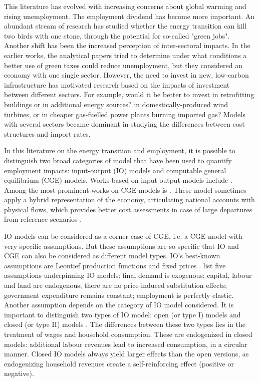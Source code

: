 This literature has evolved with increasing concerns about global warming and rising unemployment. The employment dividend has become more important. An abundant stream of research has studied whether the energy transition can kill two birds with one stone, through the potential for so-called "green jobs".
Another shift has been the increased perception of inter-sectoral impacts.
In the earlier works, the analytical papers \citep{Bovenberg1994, Bovenberg1996} tried to determine under what conditions a better use of green taxes could reduce unemployment, but they considered an economy with one single sector.
However, the need to invest in new, low-carbon infrastructure has motivated research based on the impacts of investment between different sectors. For example, would it be better to invest in retrofitting buildings or in additional energy sources? in domestically-produced wind turbines, or in cheaper gas-fuelled power plants burning imported gas? 
Models with several sectors became dominant in studying the differences between cost structures and import rates.

In this literature on the energy transition and employment, it is possible to distinguish two broad categories of model that have been used to quantify employment impacts: input-output (IO) models and computable general equilibrium (CGE) models.
Works based on input-output models include \citet{Hillebrand2006, Scott2008, deArce2012, Markaki2013, Quirion2013, Hartwig2016, Yushchenko2016, Li2016, Garrett2017}.
Among the most prominent works on CGE models is \citet{Lehr2008, Lehr2012, Bohringer2013, Bibas2013, Blazejczak2014, Creutzig2014, Duscha2014, Duscha2016}. These model sometimes apply a hybrid representation of the economy, articulating national accounts with physical flows, which provides better cost assessments  in case of large departures from reference scenarios \citep{Ghersi2006}.

IO models can be considered as a corner-case of CGE, i.e. a CGE model with very specific assumptions. But these assumptions are so specific that IO and CGE can also be considered as different model types. IO's best-known assumptions are Leontief production functions and fixed prices \citep{Miller2009}. \citet{Dwyer2005} list five assumptions underpinning IO models: final demand is exogenous; capital, labour and land are endogenous; there are no price-induced substitution effects; government expenditure remains constant; employment is perfectly elastic. 
Another assumption depends on the category of IO model considered. It is important to distinguish two types of IO model: open (or type I) models and closed (or type II) models \citep{Miller2009}. The differences between these two types lies in the treatment of wages and household consumption. These are endogenized in closed models: additional labour revenues lead to increased consumption, in a circular manner. Closed IO models always yield larger effects than the open versions, as endogenizing household revenues create a self-reinforcing effect (positive or negative).

